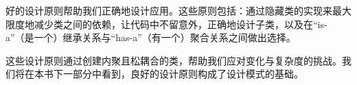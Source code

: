好的设计原则帮助我们正确地设计应用。这些原则包括：通过隐藏类的实现来最大限度地减少类之间的依赖，让代码中不留意外，正确地设计子类，以及在“is-a”（是一个）继承关系与“has-a”（有一个）聚合关系之间做出选择。

这些设计原则通过创建内聚且松耦合的类，帮助我们应对变化与复杂度的挑战。我们将在本书下一部分中看到，良好的设计原则构成了设计模式的基础。
